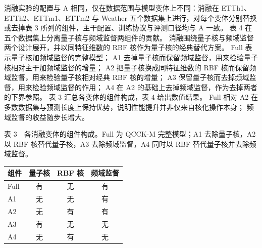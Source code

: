 消融实验的配置与 A 相同，仅在数据范围与模型变体上不同：消融在 ETTh1、ETTh2、ETTm1、ETTm2 与 Weather 五个数据集上进行，对每个变体分别替换或去掉表 3 所列的组件，主干配置、训练协议与评测口径均与 A 一致。
表 4 在五个数据集上分离量子核与频域监督两组件的贡献。
消融围绕量子核与频域监督两个设计展开，并以同特征维数的 RBF 核作为量子核的经典替代方案。
Full 表示量子核加频域监督的完整模型；
A1 去掉量子核而保留频域监督，用来检验量子核相对主干加频域监督的增量；
A2 把量子核换成同特征维数的 RBF 核而保留频域监督，用来检验量子核相对经典 RBF 核的增量；
A3 保留量子核而去掉频域监督，用来检验频域监督的作用；
A4 在 A2 的基础上去掉频域监督，作为去掉两者的下界参照。
表 3 汇总各变体的组件构成，表 4 给出数值结果。
Full 相对 A2 在多数数据集与预测长度上保持优势，说明性能提升并非仅来自核化操作本身；
频域监督的收益随步长增大。

\begin{center}

\begin{minipage}{\textwidth}

\footnotesize

表 3　各消融变体的组件构成。Full 为 QCCK-M 完整模型；A1 去除量子核，A2 以 RBF 核替代量子核，A3 去除频域监督，A4 同时以 RBF 替代量子核并去除频域监督。\\[2pt]

\centering

\setlength{\tabcolsep}{4pt}

\begin{tabular}{@{}lccc@{}}

\hline

组件 & 量子核 & RBF 核 & 频域监督 \\ \hline

Full & 有 & 无 & 有 \\

A1 & 无 & 无 & 有 \\

A2 & 无 & 有 & 有 \\

A3 & 有 & 无 & 无 \\

A4 & 无 & 有 & 无 \\

\hline

\end{tabular}

\end{minipage}

\end{center}

